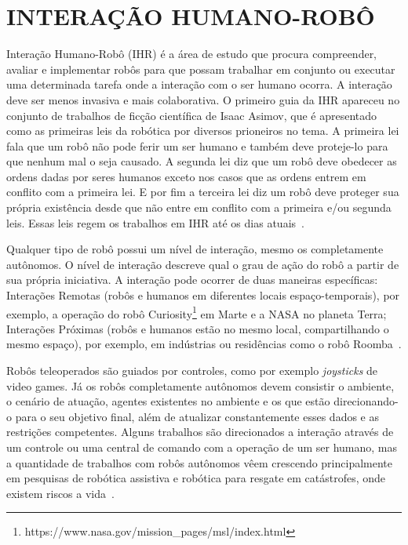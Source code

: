 \chapter{INTERAÇÃO HUMANO-ROBÔ}
\label{cap:ihr}
Interação Humano-Robô (IHR) é a área de estudo que procura compreender, avaliar e implementar robôs para que possam trabalhar em conjunto ou executar uma determinada tarefa onde a interação com o ser humano ocorra. A interação deve ser menos invasiva e mais colaborativa. O primeiro guia da IHR apareceu no conjunto de trabalhos de ficção científica de Isaac Asimov, que é apresentado como as primeiras leis da robótica por diversos prioneiros no tema. A primeira lei fala que um robô não pode ferir um ser humano e também deve proteje-lo para que nenhum mal o seja causado. A segunda lei diz que um robô deve obedecer as ordens dadas por seres humanos exceto nos casos que as ordens entrem em conflito com a primeira lei. E por fim a terceira lei diz um robô deve proteger sua própria existência desde que não entre em conflito com a primeira e/ou segunda leis. Essas leis regem os trabalhos em IHR até os dias atuais~\cite{goodrich:2007, weiss:2010}.

Qualquer tipo de robô possui um nível de interação, mesmo os completamente autônomos. O nível de interação descreve qual o grau de ação do robô a partir de sua própria iniciativa. A interação pode ocorrer de duas maneiras específicas: Interações Remotas (robôs e humanos em diferentes locais espaço-temporais), por exemplo, a operação do robô Curiosity\footnote{https://www.nasa.gov/mission\_pages/msl/index.html} em Marte e a NASA no planeta Terra; Interações Próximas (robôs e humanos estão no mesmo local, compartilhando o mesmo espaço), por exemplo, em indústrias ou residências como o robô Roomba~\cite{goodrich:2007}.

Robôs teleoperados são guiados por controles, como por exemplo \emph{joysticks} de video games. Já os robôs completamente autônomos devem consistir o ambiente, o cenário de atuação, agentes existentes no ambiente e os que estão direcionando-o para o seu objetivo final, além de atualizar constantemente esses dados e as restrições competentes. Alguns trabalhos são direcionados a interação através de um controle ou uma central de comando com a operação de um ser humano, mas a quantidade de trabalhos com robôs autônomos vêem crescendo principalmente em pesquisas de robótica assistiva e robótica para resgate em catástrofes, onde existem riscos a vida~\cite{goodrich:2007, weiss:2010}.

